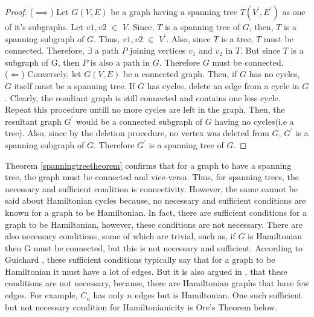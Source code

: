 \documentclass{article}
\begin{document}
\begin{proof}
($\implies$) Let $\mathit{G(V,E)}$ be a graph having a spanning tree $\mathit{T(V^\prime,E^\prime)}$ as one of it's subgraphs. Let $\mathit{v1, v2}$ $\in$ $\mathit{V}$. Since, $\mathit{T}$ is a spanning tree of $\mathit{G}$, then, $\mathit{T}$ is a spanning subgraph of $\mathit{G}$. Thus, $\mathit{v1, v2}$ $\in$ $V^\prime$. Also, since $\mathit{T}$ is a tree, $\mathit{T}$ must be connected. Therefore, $\exists$ a path $\mathit{P}$ joining vertices $\mathit{v_1}$ and $\mathit{v_2}$ in $\mathit{T}$. But since $\mathit{T}$ is a subgraph of G, then $\mathit{P}$ is also a path in $\mathit{G}$. Therefore $\mathit{G}$ must be connected.\\
($\Leftarrow$) Conversely, let $\mathit{G(V,E)}$ be a connected graph. Then, if $\mathit{G}$ has no cycles, $\mathit{G}$ itself must be a spanning tree. If $\mathit{G}$ has cycles, delete an edge from a cycle in $\mathit{G}$. Clearly, the resultant graph is still connected and contains one less cycle. Repeat this procedure untill no more cycles are left in the graph. Then, the resultant graph $\mathit{G^\prime}$ would be a connected subgraph of $\mathit{G}$ having no cycles(i.e a tree). Also, since by the deletion procedure, no vertex was deleted from $\mathit{G}$, $\mathit{G^\prime}$ is a spanning subgraph of $\mathit{G}$. Therefore $\mathit{G^\prime}$ is a spanning tree of $\mathit{G}$. 
\end{proof}
Theorem \ref{spanningtreetheorem} confirms that for a graph to have a spanning tree, the graph must be connected and vice-versa. Thus, for spanning trees, the necessary and sufficient condition is connectivity. However, the same cannot be said about Hamiltonian cycles because, no necessary and sufficient conditions are known for a graph to be Hamiltonian. In fact, there are sufficient conditions for a graph to be Hamiltonian, however, these conditions are not necessary. There are also necessary conditions, some of which are trivial, such as, if $\mathit{G}$ is Hamiltonian then G must be connected, but this is not necessary and sufficient. According to Guichard \cite{guichard_2018}, these sufficient conditions typically say that for a graph to be Hamiltonian it must have a lot of edges. But it is also argued in \cite{guichard_2018}, that these conditions are not necessary, because, there are Hamiltonian graphs that have few edges. For example, $\mathit{C_n}$ has only $\mathit{n}$ edges but is Hamiltonian. One such sufficient but not necessary condition for Hamiltonianicity is Ore's Theorem below.
\end{document}
